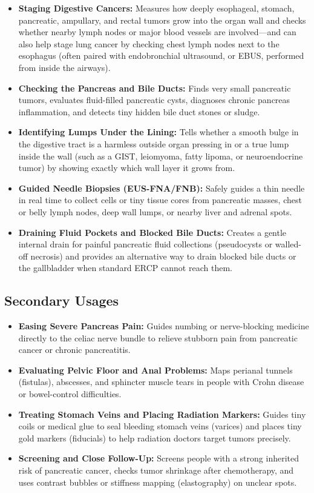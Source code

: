 \begin{itemize}
    \item \textbf{Staging Digestive Cancers:} Measures how deeply esophageal, stomach, pancreatic, ampullary, and rectal tumors grow into the organ wall and checks whether nearby lymph nodes or major blood vessels are involved---and can also help stage lung cancer by checking chest lymph nodes next to the esophagus (often paired with endobronchial ultrasound, or EBUS, performed from inside the airways).
    \item \textbf{Checking the Pancreas and Bile Ducts:} Finds very small pancreatic tumors, evaluates fluid-filled pancreatic cysts, diagnoses chronic pancreas inflammation, and detects tiny hidden bile duct stones or sludge.
    \item \textbf{Identifying Lumps Under the Lining:} Tells whether a smooth bulge in the digestive tract is a harmless outside organ pressing in or a true lump inside the wall (such as a GIST, leiomyoma, fatty lipoma, or neuroendocrine tumor) by showing exactly which wall layer it grows from.
    \item \textbf{Guided Needle Biopsies (EUS-FNA/FNB):} Safely guides a thin needle in real time to collect cells or tiny tissue cores from pancreatic masses, chest or belly lymph nodes, deep wall lumps, or nearby liver and adrenal spots.
    \item \textbf{Draining Fluid Pockets and Blocked Bile Ducts:} Creates a gentle internal drain for painful pancreatic fluid collections (pseudocysts or walled-off necrosis) and provides an alternative way to drain blocked bile ducts or the gallbladder when standard ERCP cannot reach them.
\end{itemize}

\subsection{Secondary Usages}

\begin{itemize}
    \item \textbf{Easing Severe Pancreas Pain:} Guides numbing or nerve-blocking medicine directly to the celiac nerve bundle to relieve stubborn pain from pancreatic cancer or chronic pancreatitis.
    \item \textbf{Evaluating Pelvic Floor and Anal Problems:} Maps perianal tunnels (fistulas), abscesses, and sphincter muscle tears in people with Crohn disease or bowel-control difficulties.
    \item \textbf{Treating Stomach Veins and Placing Radiation Markers:} Guides tiny coils or medical glue to seal bleeding stomach veins (varices) and places tiny gold markers (fiducials) to help radiation doctors target tumors precisely.
    \item \textbf{Screening and Close Follow-Up:} Screens people with a strong inherited risk of pancreatic cancer, checks tumor shrinkage after chemotherapy, and uses contrast bubbles or stiffness mapping (elastography) on unclear spots.
\end{itemize}

